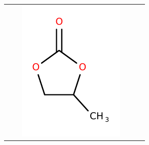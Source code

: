 \documentclass[journal=jpcbfk,manuscript=article]{achemso}
\begin{document}
\begin{table}[h!]
\begin{tabular}{ |m{3.5cm}m{1.4cm}m{2cm}|m{3.8cm}m{1.4cm}m{2cm}| }
    \color{yellow!70!orange}{Propylene Carbonate} & \color{yellow!70!orange}{PC} &     
    \begin{minipage}{.1\textwidth}
    \includegraphics[width=\linewidth]{structures/PCB.pdf}
    \end{minipage} \\
    

\end{tabular}
\end{table}
\end{document}
